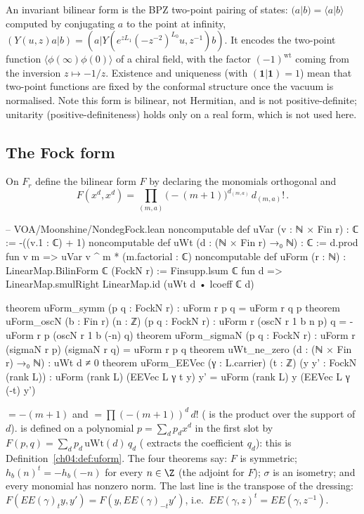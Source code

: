 \begin{physics}
An invariant bilinear form is the BPZ two-point pairing of states: $(a|b)=\langle a|b\rangle$ computed by conjugating $a$ to the point at infinity, $(Y(u,z)a|b)=(a|Y(e^{zL_1}(-z^{-2})^{L_0}u,z^{-1})b)$. It encodes the two-point function $\langle\phi(\infty)\phi(0)\rangle$ of a chiral field, with the factor $(-1)^{\mathrm{wt}}$ coming from the inversion $z\mapsto-1/z$. Existence and uniqueness (with $(\mathbf 1|\mathbf 1)=1$) mean that two-point functions are fixed by the conformal structure once the vacuum is normalised. Note this form is bilinear, not Hermitian, and is not positive-definite; unitarity (positive-definiteness) holds only on a real form, which is not used here.
\end{physics}

\subsection{The Fock form}

\begin{definition}\label{ch04:def:uform}
On $F_r$ define the bilinear form $F$ by declaring the monomials orthogonal and
\begin{equation*}
  F(x^d,x^d)=\prod_{(m,a)}\big(-(m+1)\big)^{d_{(m,a)}}\,d_{(m,a)}!\,.
\end{equation*}
\end{definition}

\begin{leancode}
-- VOA/Moonshine/NondegFock.lean
noncomputable def uVar (v : ℕ × Fin r) : ℂ := -((v.1 : ℂ) + 1)
noncomputable def uWt (d : (ℕ × Fin r) →₀ ℕ) : ℂ :=
  d.prod fun v m => uVar v ^ m * (m.factorial : ℂ)
noncomputable def uForm (r : ℕ) : LinearMap.BilinForm ℂ (FockN r) :=
  Finsupp.lsum ℂ fun d => LinearMap.smulRight LinearMap.id (uWt d • lcoeff ℂ d)

theorem uForm_symm (p q : FockN r) : uForm r p q = uForm r q p
theorem uForm_oscN (b : Fin r) (n : ℤ) (p q : FockN r) :
    uForm r (oscN r 1 b n p) q = -uForm r p (oscN r 1 b (-n) q)
theorem uForm_sigmaN (p q : FockN r) : uForm r (sigmaN r p) (sigmaN r q) = uForm r p q
theorem uWt_ne_zero (d : (ℕ × Fin r) →₀ ℕ) : uWt d ≠ 0
theorem uForm_EEVec (γ : L.carrier) (t : ℤ) (y y' : FockN (rank L)) :
    uForm (rank L) (EEVec L γ t y) y' = uForm (rank L) y (EEVec L γ (-t) y')
\end{leancode}

\begin{dictionary}
 $=-(m+1)$ and  $=\prod(-(m+1))^{d}\,d!$ ( is the product
over the support of $d$).  is defined on a polynomial $p=\sum_dp_dx^d$ in the first slot
by $F(p,q)=\sum_dp_d\,\mathrm{uWt}(d)\,q_d$ ( extracts the coefficient $q_d$): this is
Definition~\ref{ch04:def:uform}. The four theorems say: $F$ is symmetric; $h_b(n)^t=-h_b(-n)$ for
every $n\in\Z$ (the adjoint for $F$); $\sigma$ is an isometry; and every monomial has nonzero norm.
The last line is the transpose of the dressing: $F(EE(\gamma)_ty,y')=F(y,EE(\gamma)_{-t}y')$, i.e.\
$EE(\gamma,z)^t=EE(\gamma,z^{-1})$.
\end{dictionary}

